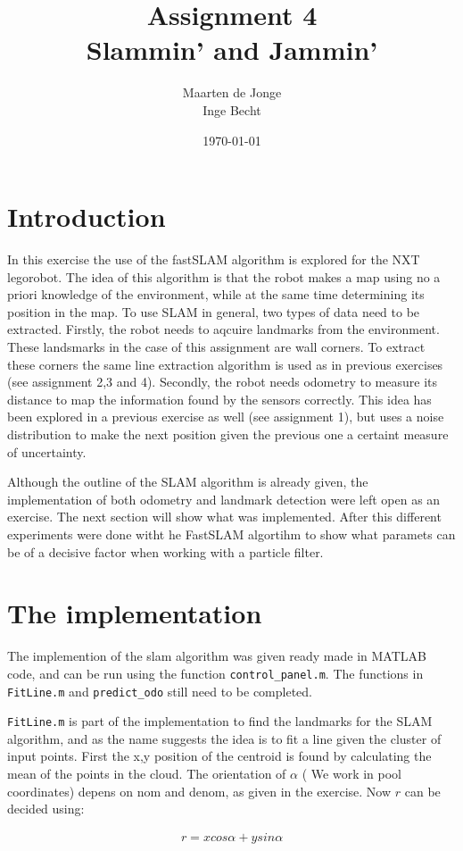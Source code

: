 \documentclass[a4paper, 20pt]{article}
\author{Maarten de Jonge \\
    Inge Becht}
\date{\today}
\title{Assignment 4\\ 
Slammin' and Jammin'}
\begin{document}
\maketitle
\section{Introduction}
In this exercise the use of the fastSLAM algorithm is explored for the NXT
legorobot. The idea of this algorithm is that the robot makes a map using no a
priori knowledge of the environment,
while at the same time determining its position in the map.
To use SLAM in general, two types of data need to be extracted. Firstly, the robot needs to aqcuire landmarks from the
environment. These landsmarks in the case of this assignment are wall corners. To extract these
corners the same line extraction algorithm is used as in previous exercises (see assignment 2,3 and 4). 
Secondly, the robot needs odometry to measure its distance to map the information found by the
sensors correctly. This idea has been explored in a
previous exercise as well (see assignment 1), but uses a noise distribution to
make the next position given the previous one a certaint measure of uncertainty.

Although the outline of the SLAM algorithm is already given, the implementation
of both odometry and landmark detection were left open as an exercise. The next
section will show what was implemented. After this different experiments were
done witht he FastSLAM
algortihm to show what paramets can be of a decisive factor when working with a
particle filter.


\section{The implementation}
The implemention of the slam algorithm was given ready made in MATLAB code, and
can be run using the function \texttt{control\_panel.m}. The functions in
\texttt{FitLine.m} and \texttt{predict\_odo} still need to be completed.

\texttt{FitLine.m} is part of the implementation to find the landmarks for the
SLAM algorithm, and as the name suggests the idea is to fit a line given the
cluster of input points. First the x,y position of the centroid is found by
calculating the mean of the points in the cloud. The orientation of $\alpha$ (
We work in pool coordinates) depens on nom and denom, as given in the exercise.
Now $r$ can be decided using:

\begin{align*}
    r = x cos \alpha + y sin \alpha
\end{align*}
\end{document}
